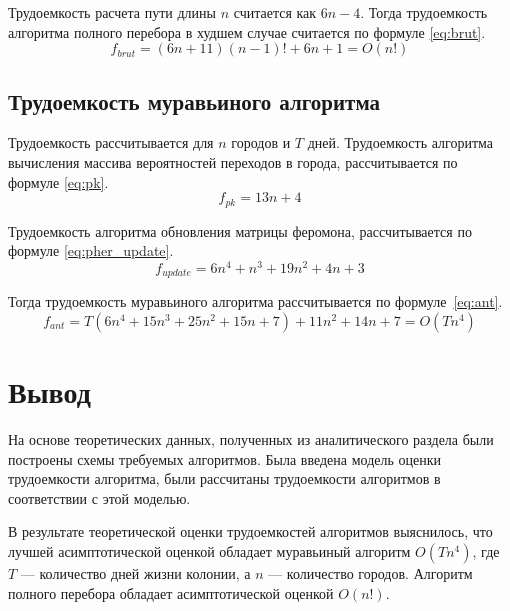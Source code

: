 Трудоемкость расчета пути длины $n$ считается как $6n - 4$. Тогда трудоемкость алгоритма полного перебора в худшем случае считается по формуле \eqref{eq:brut}.
\begin{equation}
	\label{eq:brut}
	f_{brut} = (6n + 11)(n-1)! + 6n + 1 = O(n!)
\end{equation}


\subsection{Трудоемкость муравьиного алгоритма}

Трудоемкость рассчитывается для $n$ городов и $T$ дней. Трудоемкость алгоритма вычисления массива вероятностей переходов в города, рассчитывается по формуле \eqref{eq:pk}.
\begin{equation}
	\label{eq:pk}
	f_{pk} = 13n + 4
\end{equation}

Трудоемкость алгоритма обновления матрицы феромона, рассчитывается по формуле \eqref{eq:pher_update}.
\begin{equation}
	\label{eq:pher_update}
	f_{update} = 6n^4 + n^3 + 19n^2 + 4n + 3
\end{equation}

Тогда трудоемкость муравьиного алгоритма рассчитывается по формуле~\eqref{eq:ant}.
\begin{equation}
	\label{eq:ant}
	f_{ant} = T(6n^4 + 15n^3 + 25n^2 + 15n + 7) + 11n^2 + 14n + 7 = O(Tn^4)
\end{equation}

\section*{Вывод}
На основе теоретических данных, полученных из аналитического раздела были построены схемы требуемых алгоритмов. 
Была введена модель оценки трудоемкости алгоритма, были рассчитаны трудоемкости алгоритмов в соответствии с этой моделью.

В результате теоретической оценки трудоемкостей алгоритмов выяснилось, что лучшей асимптотической оценкой обладает муравьиный алгоритм $O(Tn^4)$, где $T$ --- количество дней жизни колонии, а $n$ --- количество городов. 
Алгоритм полного перебора обладает асимптотической оценкой $O(n!)$.
